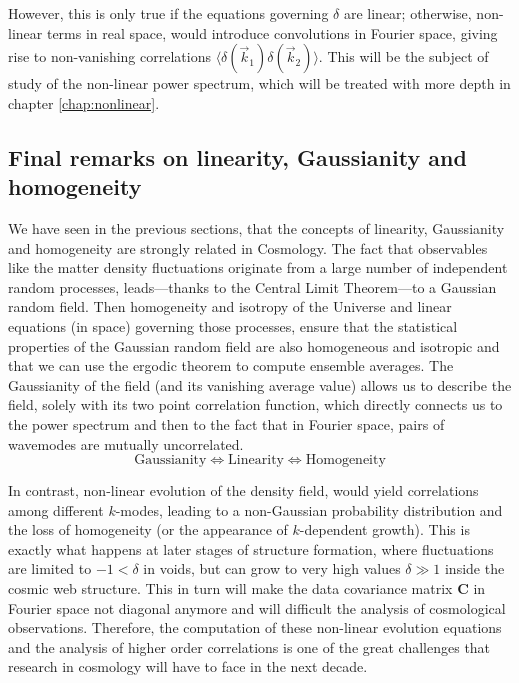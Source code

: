 However, this is only true if the equations governing $\delta$ are linear; otherwise, non-linear terms in real space,
would introduce convolutions in Fourier space, giving rise to non-vanishing correlations $\langle \delta (\vec{k}_1)  \delta (\vec{k}_2) \rangle$. This will be the subject of study of the non-linear power spectrum, which will be treated with more depth in chapter \ref{chap:nonlinear}.

\subsection{Final remarks on linearity, Gaussianity and homogeneity}

We have seen in the previous sections, that the concepts of linearity, Gaussianity and homogeneity
are strongly related in Cosmology.
The fact that observables like the matter density fluctuations originate from a large number 
of independent random processes, leads---thanks to the Central Limit Theorem---to a Gaussian random field.
Then homogeneity and isotropy of the Universe and linear equations (in space) governing those processes, ensure that the statistical properties of the Gaussian random field
are also homogeneous and isotropic and that we can use the ergodic theorem to compute ensemble averages.
The Gaussianity of the field (and its vanishing average value) allows us to describe the field, solely with its two
point correlation function, which directly connects us to the power spectrum and then to the fact that in Fourier space, 
pairs of wavemodes are mutually uncorrelated.
\begin{equation}
\textrm{Gaussianity}\Leftrightarrow\textrm{Linearity}\Leftrightarrow\textrm{Homogeneity}
\end{equation}

In contrast, non-linear evolution of the density field, would yield correlations among different $k$-modes, 
leading to a non-Gaussian probability distribution and the loss of homogeneity (or the appearance of $k$-dependent growth).
This is exactly what happens at later stages of structure formation, 
where fluctuations are limited to $-1 < \delta$ in voids, 
but can grow to very high values $\delta \gg 1$ inside the cosmic web structure.
This in turn will make the data covariance matrix $\mathbf{C}$ in Fourier space not diagonal anymore and 
will difficult the analysis of cosmological observations.
Therefore, the computation
of these non-linear evolution equations 
and the analysis of higher order correlations is one of the great challenges that research in cosmology 
will have to face in the next decade.


